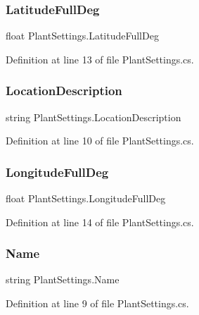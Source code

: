 \subsubsection{\texorpdfstring{LatitudeFullDeg}{LatitudeFullDeg}}
{\footnotesize\ttfamily float Plant\+Settings.\+Latitude\+Full\+Deg}



Definition at line 13 of file Plant\+Settings.\+cs.

\mbox{\label{class_plant_settings_a2bbf2e3449fb49879511e48455fcb61c}} 
\subsubsection{\texorpdfstring{LocationDescription}{LocationDescription}}
{\footnotesize\ttfamily string Plant\+Settings.\+Location\+Description}



Definition at line 10 of file Plant\+Settings.\+cs.

\mbox{\label{class_plant_settings_a8710d8ee2ca86ec19eda05fb5aaf0c76}} 
\subsubsection{\texorpdfstring{LongitudeFullDeg}{LongitudeFullDeg}}
{\footnotesize\ttfamily float Plant\+Settings.\+Longitude\+Full\+Deg}



Definition at line 14 of file Plant\+Settings.\+cs.

\mbox{\label{class_plant_settings_a177bfddd185ddca1d0784c1a40c2b1e5}} 
\subsubsection{\texorpdfstring{Name}{Name}}
{\footnotesize\ttfamily string Plant\+Settings.\+Name}



Definition at line 9 of file Plant\+Settings.\+cs.

